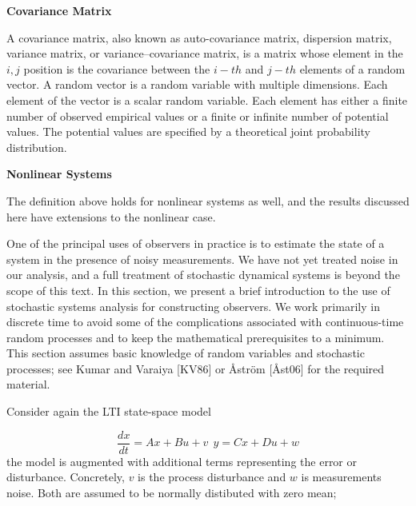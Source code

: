 \begin{framed}
\theoremstyle{remark}
\begin{remark}{\textbf{Covariance Matrix}}

A covariance matrix, also known as auto-covariance matrix, dispersion matrix, variance matrix, or variance–covariance matrix, 
is a matrix whose element in the $i, j$ position is the covariance between the $i-th$ and $j-th$ elements of a random vector. 
A random vector is a random variable with multiple dimensions. 
Each element of the vector is a scalar random variable. 
Each element has either a finite number of observed empirical values or a finite or infinite number of potential values. 
The potential values are specified by a theoretical joint probability distribution. 
\end{remark}
\end{framed}



\begin{framed}
\theoremstyle{remark}
\begin{remark}{\textbf{Nonlinear Systems}}

The definition above holds for nonlinear systems as well, and the results discussed here have extensions to the nonlinear case.
\end{remark}
\end{framed}


One of the principal uses of observers in practice is to estimate the state of a
system in the presence of noisy measurements. We have not yet treated noise in our
analysis, and a full treatment of stochastic dynamical systems is beyond the scope
of this text. In this section, we present a brief introduction to the use of stochastic
systems analysis for constructing observers. We work primarily in discrete time to
avoid some of the complications associated with continuous-time random processes
and to keep the mathematical prerequisites to a minimum. This section assumes
basic knowledge of random variables and stochastic processes; see Kumar and
Varaiya [KV86] or Åström [Åst06] for the required material.




Consider again the LTI state-space model

\begin{equation}
\frac{dx}{dt} = Ax + Bu +v  ~~ y = Cx + Du +w 
\end{equation}
the model is augmented with additional terms representing the error or disturbance. Concretely,
$v$ is the process disturbance and $w$ is measurements noise. Both are assumed to be normally distibuted with zero mean;

